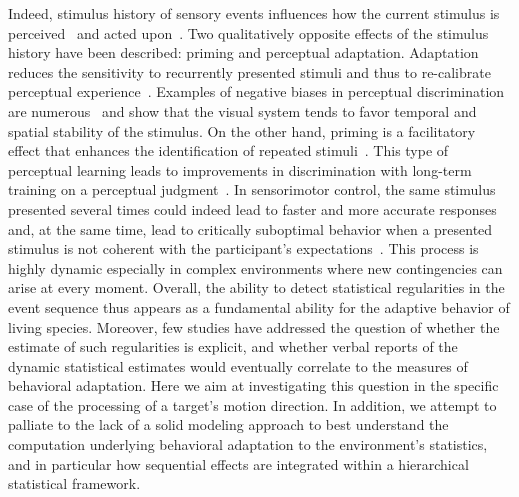 \documentclass[12pt,english]{article}%
\newcommand{\citep}[1]{\parencite{#1}}
\begin{document}
Indeed, stimulus history of sensory events influences
how the current stimulus is perceived~\citep{Sotiropoulos2011, Adams12} and 
acted upon~\citep{Carpenter1995, Maus2015,Damasse18}.
Two qualitatively opposite effects of the stimulus history have been described: 
priming and perceptual adaptation. 
Adaptation reduces the sensitivity to recurrently presented stimuli and
thus to re-calibrate perceptual experience~\citep{Clifford2007, Webster2011, Kohn2007}.
Examples of negative biases in perceptual discrimination are
numerous~\citep{REFFS} and show that the visual system tends
to favor temporal and spatial stability of the stimulus.
On the other hand, priming is a facilitatory effect that
enhances the identification of repeated stimuli~\citep{Verstraten1994, Tiest2009}.
This type of perceptual learning leads to improvements in discrimination
with long-term training on a perceptual judgment~\citep{Lu2009}.
In sensorimotor control,
the same stimulus presented several times could indeed
lead to faster and more accurate responses and,
at the same time, lead to critically suboptimal behavior
when a presented stimulus is not coherent
with the participant's expectations~\citep{Hyman1953, Yu2009}.
This process is highly dynamic especially in complex environments
where new contingencies can arise at every moment.
Overall, the ability to detect
statistical regularities in the event sequence
thus appears as a fundamental ability
for the adaptive behavior of living species.
Moreover, few studies have addressed the question of whether
the estimate of such regularities is explicit,
and whether verbal reports of the dynamic statistical
estimates would eventually correlate to the measures of behavioral adaptation. 
Here we aim at investigating this question 
in the specific case of the  processing of a target's motion direction.
In addition, we attempt to palliate to the lack of a solid modeling approach 
to best understand the computation underlying behavioral adaptation to the environment's statistics,
and in particular how sequential effects are integrated
within a hierarchical statistical framework.
\end{document}
